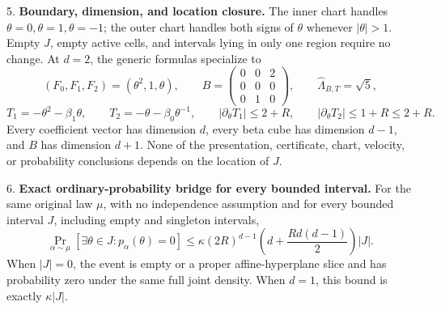 \begin{proposition}
5. \textbf{Boundary, dimension, and location closure.} The inner chart handles \(\theta=0,\theta=1,\theta=-1\); the outer chart handles both signs of \(\theta\) whenever \(\lvert\theta\rvert>1\). Empty \(J\), empty active cells, and intervals lying in only one region require no change. At \(d=2\), the generic formulas specialize to
\begin{equation}
\label{eq:appendix-indented-031}
   (F_0,F_1,F_2)=(\theta^2,1,\theta),
   \qquad
   B=\begin{pmatrix}0&0&2\\0&0&0\\0&1&0\end{pmatrix},
   \qquad
   \widehat\Lambda_{B,T}=\sqrt5,
\end{equation}
\begin{equation}
\label{eq:appendix-indented-032}
   T_1=-\theta^2-\beta_1\theta,
   \qquad
   T_2=-\theta-\beta_0\theta^{-1},
   \qquad
   \lvert\partial_\theta T_1\rvert\leq2+R,
   \qquad
   \lvert\partial_\theta T_2\rvert\leq1+R\leq2+R.
\end{equation}
   Every coefficient vector has dimension \(d\), every beta cube has dimension \(d-1\), and \(B\) has dimension \(d+1\). None of the presentation, certificate, chart, velocity, or probability conclusions depends on the location of \(J\).

6. \textbf{Exact ordinary-probability bridge for every bounded interval.} For the same original law \(\mu\), with no independence assumption and for every bounded interval \(J\), including empty and singleton intervals,
\begin{equation}
\label{eq:appendix-indented-033}
   \boxed{
   \Pr_{\alpha\sim\mu}[\exists\theta\in J:p_\alpha(\theta)=0]
   \leq
   \kappa(2R)^{d-1}
   \left(d+\frac{Rd(d-1)}2\right)\lvert J\rvert.}
\end{equation}
   When \(\lvert J\rvert=0\), the event is empty or a proper affine-hyperplane slice and has probability zero under the same full joint density. When \(d=1\), this bound is exactly \(\kappa\lvert J\rvert\).


\end{proposition}

